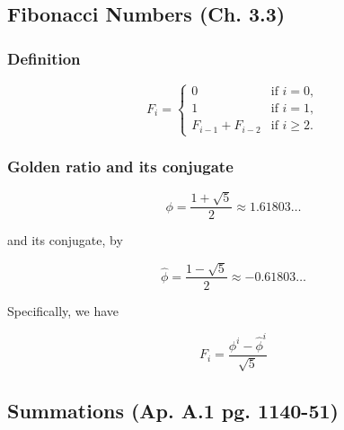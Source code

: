 \subsection{Fibonacci Numbers (Ch. 3.3)}
    \subsubsection{Definition}
        \begin{definition}
            \begin{equation}
                F_i = 
                \begin{cases}
                    0 & \text{if } i = 0, \\
                    1 & \text{if } i = 1, \\
                    F_{i-1} + F_{i-2} & \text{if } i \geq 2.
                \end{cases}
            \end{equation}
        \end{definition}
    
    \subsubsection{Golden ratio and its conjugate}
        \begin{definition}
            \begin{equation}
                \phi = \frac{1 + \sqrt{5}}{2} \approx 1.61803\ldots \label{eq:phi}
            \end{equation}
            
            and its conjugate, by
            
            \begin{equation}
                \hat{\phi} = \frac{1 - \sqrt{5}}{2} \approx -0.61803\ldots \label{eq:phihat}
            \end{equation}
            
            Specifically, we have
            
            \begin{equation}
                F_i = \frac{\phi^i - \hat{\phi}^i}{\sqrt{5}} \label{eq:fibonacci}
            \end{equation}
            
        \end{definition}

\subsection{Summations (Ap. A.1 pg. 1140-51)}
